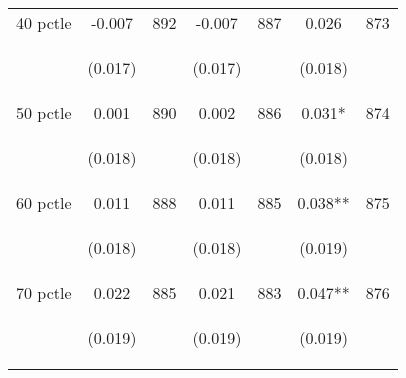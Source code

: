 \begin{tabular}{lcccccc}
40 pctle   &  -0.007   &  892  &   -0.007  &  887 &  0.026  &  873   \\

\vspace{4pt} &  \begin{footnotesize}(0.017)\end{footnotesize}   & &
			    \begin{footnotesize}(0.017)\end{footnotesize}   & &
			    \begin{footnotesize}(0.018)\end{footnotesize}   &
			     \\          

50 pctle   &  0.001   &  890  &   0.002  &  886 &  0.031*  &  874   \\

\vspace{4pt} &  \begin{footnotesize}(0.018)\end{footnotesize}   & &
			    \begin{footnotesize}(0.018)\end{footnotesize}   & &
			    \begin{footnotesize}(0.018)\end{footnotesize}   &
			     \\          

60 pctle   &  0.011   &  888  &   0.011  &  885 &  0.038**  &  875   \\


\vspace{4pt} &  \begin{footnotesize}(0.018)\end{footnotesize}   & &
			    \begin{footnotesize}(0.018)\end{footnotesize}   & &
			    \begin{footnotesize}(0.019)\end{footnotesize}   &
			     \\          

70 pctle   &  0.022   &  885  &   0.021  &  883 &  0.047**  &  876   \\

\vspace{4pt} &  \begin{footnotesize}(0.019)\end{footnotesize}   & &
			    \begin{footnotesize}(0.019)\end{footnotesize}   & &
			    \begin{footnotesize}(0.019)\end{footnotesize}   &
			     \\          


\end{tabular}
